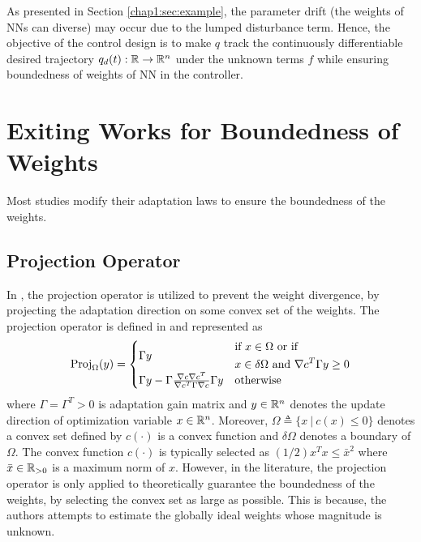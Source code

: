 As presented in Section \ref{chap1:sec:example}, the parameter drift (\ie the weights of NNs can diverse) may occur due to the lumped disturbance term.
Hence, the objective of the control design is to make $q$ track the continuously differentiable desired trajectory $q_d(t):\mathbb{R}\to \mathbb{R}^n$ under the unknown terms $f$ while ensuring boundedness of weights of NN in the controller.

\section{Exiting Works for Boundedness of Weights} 

Most studies modify their adaptation laws to ensure the boundedness of the weights.

\subsection{Projection Operator} \label{chap3:sec:proj}

In \cite{RN13, RN11, RN21}, the projection operator is utilized to prevent the weight divergence, by projecting the adaptation direction on some convex set of the weights.
The projection operator is defined in \cite[Appendix E, eq.~(E.4)]{RN7} and represented as
\begin{equation}
    \text{Proj}_\Omega(y)
    =
    \begin{cases}
        \Gamma y
        &
        \begin{aligned}
            &\text{if }x\in\Omega
            \text{ or if }\\
            &x\in\delta\Omega
            \text{ and }
            \nabla c^T\Gamma y\ge0
        \end{aligned}
        \\
        \Gamma y
        -
        \Gamma
        {\nabla c\nabla c^T\over \nabla c^T \Gamma \nabla c}
        \Gamma y
        &
        \text{otherwise}
    \end{cases}
    \label{chap3:eq:proj}
\end{equation}
where $\Gamma=\Gamma^T>0$ is adaptation gain matrix and $y\in\mathbb{R}^n$ denotes the update direction of optimization variable $x\in\mathbb{R}^n$.
Moreover, $\Omega\triangleq \{x\ \vert\ c(x)\le 0\}$ denotes a convex set defined by $c(\cdot)$ is a convex function and $\delta\Omega$ denotes a boundary of $\Omega$.
The convex function $c(\cdot)$ is typically selected as $(1/2)x^Tx\le \bar x^2$ where $\bar x\in\mathbb{R}_{>0}$ is a maximum norm of $x$.
However, in the literature, the projection operator is only applied to theoretically guarantee the boundedness of the weights, by selecting the convex set as large as possible.
This is because, the authors attempts to estimate the globally ideal weights whose magnitude is unknown.

